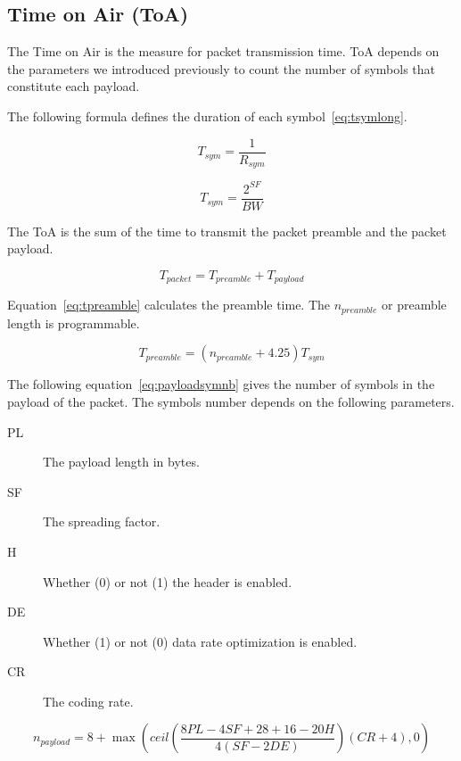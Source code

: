 \subsection{Time on Air (ToA)}

The Time on Air is the measure for packet transmission time.
ToA depends on the parameters we introduced previously to count the number of
symbols that constitute each payload.

The following formula defines the duration of each symbol~\ref{eq:tsymlong}.

\begin{equation}
  \label{eq:tsymlong}
  T_{sym} = \frac{1}{R_{sym}}
\end{equation}

\begin{equation}
  \label{eq:tsym}
  T_{sym} = \frac{2^{SF}}{BW}
\end{equation}

The ToA is the sum of the time to transmit the packet preamble and the packet
payload.

\begin{equation}
  \label{eq:tpacket}
  T_{packet} = T_{preamble} + T_{payload}
\end{equation}

Equation~\ref{eq:tpreamble} calculates the preamble time. The $n_{preamble}$
or preamble length is programmable.

\begin{equation}
  \label{eq:tpreamble}
  T_{preamble} = (n_{preamble} + 4.25)T_{sym}
\end{equation}

The following equation~\ref{eq:payloadsymnb} gives the number of symbols in the
payload of the packet.
The symbols number depends on the following parameters.

\begin{description}
  \item[PL] The payload length in bytes.
  \item[SF] The spreading factor.
  \item[H] Whether (0) or not (1) the header is enabled.
  \item[DE] Whether (1) or not (0) data rate optimization is enabled.
  \item[CR] The coding rate.
\end{description}

\begin{equation}
  \label{eq:payloadsymnb}
  n_{payload} = 8 + \max(ceil(\frac{8PL - 4SF + 28 + 16 - 20H}{4(SF - 2DE)})(CR + 4),0)
\end{equation}

